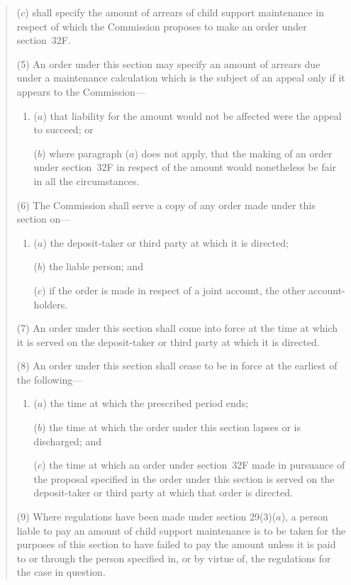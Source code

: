 \documentclass[12pt,a4paper]{article}
\begin{document}
\begin{quotation}
\begin{enumerate}
($c$) shall specify the amount of arrears of child support maintenance in respect of which the Commission proposes to make an order under section~32F.
\end{enumerate}

(5) An order under this section may specify an amount of arrears due under a maintenance calculation which is the subject of an appeal only if it appears to the Commission---
\begin{enumerate}\item[]
($a$) that liability for the amount would not be affected were the appeal to succeed; or

($b$) where paragraph ($a$) does not apply, that the making of an order under section~32F in respect of the amount would nonetheless be fair in all the circumstances.
\end{enumerate}

(6) The Commission shall serve a copy of any order made under this section on---
\begin{enumerate}\item[]
($a$)
the deposit-taker or third party at which it is directed;

($b$)
the liable person; and

($c$)
if the order is made in respect of a joint account, the other account-holders.
\end{enumerate}

(7) An order under this section shall come into force at the time at which it is served on the deposit-taker or third party at which it is directed.

(8) An order under this section shall cease to be in force at the earliest of the following---
\begin{enumerate}\item[]
($a$)
the time at which the prescribed period ends;

($b$)
the time at which the order under this section lapses or is discharged; and

($c$)
the time at which an order under section~32F made in pursuance of the proposal specified in the order under this section is served on the deposit-taker or third party at which that order is directed.
\end{enumerate}

\begin{sloppypar}
(9) Where regulations have been made under section 29(3)($a$), a person liable to pay an amount of child support maintenance is to be taken for the purposes of this section to have failed to pay the amount unless it is paid to or through the person specified in, or by virtue of, the regulations for the case in question.
\end{sloppypar}


\end{quotation}
\end{document}
